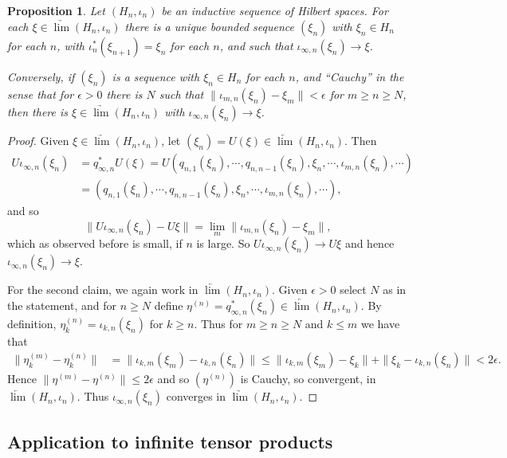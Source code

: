 \documentclass[twoside,a4paper,12pt]{article}
\theoremstyle{plain}
\newtheorem{proposition}{Proposition}[section]
\theoremstyle{definition}
\begin{document}
\begin{proposition}
Let $(H_n, \iota_n)$ be an inductive sequence of Hilbert spaces.  For each $\xi \in \underrightarrow{\lim} (H_n,\iota_n)$ there is a unique bounded sequence $(\xi_n)$ with $\xi_n\in H_n$ for each $n$, with $\iota_n^*(\xi_{n+1}) = \xi_n$ for each $n$, and such that $\iota_{\infty,n}(\xi_n) \to \xi$.

Conversely, if $(\xi_n)$ is a sequence with $\xi_n\in H_n$ for each $n$, and ``Cauchy'' in the sense that for $\epsilon>0$ there is $N$ such that $\| \iota_{m,n}(\xi_n) - \xi_m \|<\epsilon$ for $m \geq n\geq N$, then there is $\xi \in \underrightarrow{\lim} (H_n,\iota_n)$ with $\iota_{\infty,n}(\xi_n) \to \xi$.
\end{proposition}
\begin{proof}
Given $\xi \in \underrightarrow{\lim} (H_n,\iota_n)$, let $(\xi_n) = U(\xi) \in \underleftarrow{\lim} (H_n,\iota_n)$.  Then
\begin{align*}
U \iota_{\infty,n}(\xi_n)
&= q_{\infty,n}^* U(\xi)
= U(q_{n,1}(\xi_n),\cdots,q_{n,n-1}(\xi_n),\xi_n, \cdots, \iota_{m,n}(\xi_n), \cdots) \\
&= (q_{n,1}(\xi_n),\cdots,q_{n,n-1}(\xi_n),\xi_n, \cdots, \iota_{m,n}(\xi_n), \cdots),
\end{align*}
and so
\[ \| U \iota_{\infty,n}(\xi_n) - U\xi\|
= \lim_m \| \iota_{m,n}(\xi_n) - \xi_m \|, \]
which as observed before is small, if $n$ is large.  So $U \iota_{\infty,n}(\xi_n) \to U\xi$ and hence $\iota_{\infty,n}(\xi_n) \to \xi$.

For the second claim, we again work in $\underleftarrow{\lim} (H_n,\iota_n)$.  Given $\epsilon>0$ select $N$ as in the statement, and for $n\geq N$ define $\eta^{(n)} = q_{\infty,n}^*(\xi_n) \in \underleftarrow{\lim} (H_n,\iota_n)$.
By definition, $\eta^{(n)}_k = \iota_{k,n}(\xi_n)$ for $k\geq n$.  Thus for $m\geq n\geq N$ and $k\leq m$ we have that
\begin{align*}
\| \eta^{(m)}_k - \eta^{(n)}_k \|
&= \| \iota_{k,m}(\xi_m) - \iota_{k,n}(\xi_n) \|
\leq \| \iota_{k,m}(\xi_m) - \xi_k \| + \| \xi_k - \iota_{k,n}(\xi_n) \| < 2\epsilon.
\end{align*}
Hence $\| \eta^{(m)} - \eta^{(n)}\| \leq 2\epsilon$ and so $(\eta^{(n)})$ is Cauchy, so convergent, in $\underleftarrow{\lim} (H_n,\iota_n)$.  Thus $\iota_{\infty,n}(\xi_n)$ converges in $\underrightarrow{\lim} (H_n,\iota_n)$.
\end{proof}


\subsection{Application to infinite tensor products}
\end{document}
